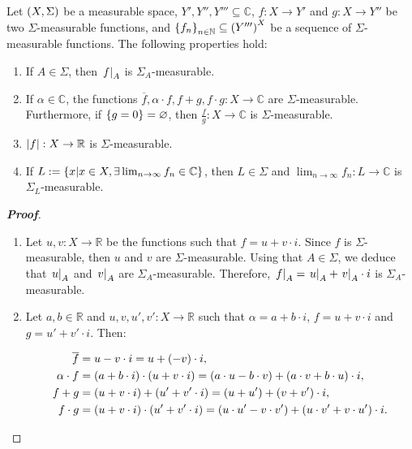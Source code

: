 \begin{corollary}
  \rm Let $\left(X,\Sigma\right)$ be a measurable space, $Y',Y'',Y'''\subseteq\mathbb{C}$,  $f:X\rightarrow Y'$ and $g:X\rightarrow Y''$ be two $\Sigma$-measurable functions, and $\left\{f_n\right\}_{n\in\mathbb{N}}\subseteq\left(Y'''\right)^X$ be a sequence of $\Sigma$-measurable functions. The following properties hold: %

  \begin{enumerate}
    \item If $A\in\Sigma$, then $\left.f\right|_{A}$ is $\Sigma_A$-measurable.
    \item If $\alpha\in\mathbb{C}$, the functions $\overline{f},\alpha\cdot f,f+g,f\cdot g:X\rightarrow\mathbb{C}$ are $\Sigma$-measurable. Furthermore, if $\left\{g=0\right\}=\varnothing$, then $\frac{f}{g}:X\rightarrow\mathbb{C}$ is $\Sigma$-measurable.
    \item $\left|f\right|:X\rightarrow\mathbb{R}$ is $\Sigma$-measurable.
    \item If $L:=\left\{x\middle|x\in X,\exists\lim_{n\to\infty}{f_n}\in\mathbb{C}\right\}$, then $L\in\Sigma$ and $\lim_{n\to\infty}{f_n}:L\rightarrow\mathbb{C}$ is $\Sigma_L$-measurable.
  \end{enumerate}
  \begin{proof}[\rm\textbf{Proof}]
    \hfill
    \begin{enumerate}
      \item Let $u,v:X\rightarrow\mathbb{R}$ be the functions such that $f=u+v\cdot i$. Since $f$ is $\Sigma$-measurable, then $u$ and $v$ are $\Sigma$-measurable. Using that $A\in\Sigma$, we deduce that $\left.u\right|_{A}$ and $\left.v\right|_{A}$ are $\Sigma_A$-measurable. Therefore, $\left.f\right|_{A}=\left.u\right|_{A}+\left.v\right|_{A}\cdot i$ is $\Sigma_A$-measurable.
      \item Let $a,b\in\mathbb{R}$ and $u,v,u',v':X\rightarrow\mathbb{R}$ such that $\alpha=a+b\cdot i$, $f=u+v\cdot i$ and $g=u'+v'\cdot i$. Then:
      
      \begin{equation}
        \begin{split}
          \overline{f} & =u-v\cdot i=u+\left(-v\right)\cdot i,\\
          \alpha\cdot f & =\left(a+b\cdot i\right)\cdot\left(u+v\cdot i\right)=\left(a\cdot u-b\cdot v\right)+\left(a\cdot v+b\cdot u\right)\cdot i,\\
          f+g &=\left(u+v\cdot i\right)+\left(u'+v'\cdot i\right)=\left(u+u'\right)+\left(v+v'\right)\cdot i,\\
          f\cdot g & =\left(u+v\cdot i\right)\cdot\left(u'+v'\cdot i\right)=\left(u\cdot u'-v\cdot v'\right)+\left(u\cdot v'+v\cdot u'\right)\cdot i.
        \end{split}
      \end{equation}


\end{enumerate}
\end{proof}
\end{corollary}
